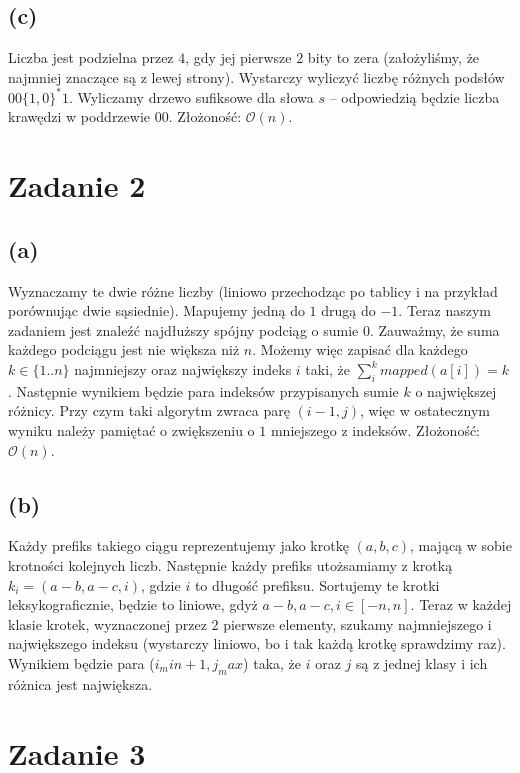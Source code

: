 \documentclass[12pt, a4paper]{article}
\newcommand{\MCALO}{\mathcal{O}}
\begin{document}
\subsection*{(c)}
Liczba jest podzielna przez $4$, gdy jej pierwsze $2$ bity to zera
(założyliśmy, że najmniej znaczące są z lewej strony).
Wystarczy wyliczyć liczbę różnych podsłów $00\{1,0\}^*1$.
Wyliczamy drzewo sufiksowe dla słowa $s$ -- odpowiedzią będzie liczba krawędzi w poddrzewie $00$.
Złożoność: $\MCALO(n)$.

\section*{Zadanie 2}
\subsection*{(a)}
Wyznaczamy te dwie różne liczby (liniowo przechodząc po tablicy i na przykład porównując dwie sąsiednie).
Mapujemy jedną do $1$ drugą do $-1$. Teraz naszym zadaniem jest znaleźć najdłuższy spójny podciąg
o sumie $0$. Zauważmy, że suma każdego podciągu jest nie większa niż $n$. Możemy więc zapisać
dla każdego $k \in \{1..n\}$ najmniejszy oraz największy indeks $i$ taki, że $\sum_{i}^k mapped(a[i]) = k$.
Następnie wynikiem będzie para indeksów przypisanych sumie $k$ o największej różnicy.
Przy czym taki algorytm zwraca parę $(i-1, j)$, więc w ostatecznym wyniku należy pamiętać o zwiększeniu
o $1$ mniejszego z indeksów.
Złożoność: $\MCALO(n)$.

\subsection*{(b)}
Każdy prefiks takiego ciągu reprezentujemy jako krotkę $(a, b, c)$, mającą
w sobie krotności kolejnych liczb. Następnie każdy prefiks utożsamiamy z krotką
$k_i = (a-b, a-c, i)$, gdzie $i$ to długość prefiksu. Sortujemy te krotki
leksykograficznie, będzie to liniowe, gdyż $a-b, a-c, i \in [-n, n]$. Teraz
w każdej klasie krotek, wyznaczonej przez $2$ pierwsze elementy, szukamy
najmniejszego i największego indeksu (wystarczy liniowo, bo i tak każdą krotkę
sprawdzimy raz). Wynikiem będzie para ($i_min + 1, j_max$) taka, że $i$ oraz
$j$ są z jednej klasy i ich różnica jest największa.

\section*{Zadanie 3}
\end{document}
